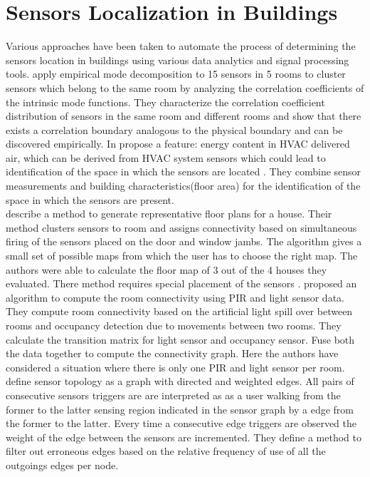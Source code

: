 \section{Sensors Localization in Buildings} 
Various approaches have been taken to automate the process of determining the sensors location in buildings using various data analytics and signal processing tools. \citeauthor{Hong:2013:TAS:2528282.2528302}\cite{Hong:2013:TAS:2528282.2528302} apply empirical mode decomposition to 15 sensors in 5 rooms to cluster sensors which belong to the same room by analyzing the correlation coefficients of the intrinsic mode functions. They characterize the correlation coefficient distribution of sensors in the same room and different rooms and show that there exists a correlation boundary analogous to the physical boundary and can be discovered empirically. 
In \cite{doi:10.1061/9780784413616.226} \citeauthor{doi:10.1061/9780784413616.226} propose a feature: energy content in HVAC delivered air, which can be derived from HVAC system sensors which could lead to identification of the space in which the sensors are located . They combine sensor measurements and building characteristics(floor area) for the identification of the space in which the sensors are present.\\ 
\citeauthor{Lu:2014:SBS:2648771.2629441}\cite{Lu:2014:SBS:2648771.2629441} describe a method to generate representative floor plans for a house. Their method clusters sensors to room and assigns connectivity based on simultaneous firing of the sensors placed on the door and window jambs. The algorithm gives a small set of possible maps from which the user has to choose the right map. The authors were able to calculate the floor map of 3 out of the 4 houses they evaluated.  There method requires special placement of the sensors .
 \citeauthor{ellis2012creating}\cite{ellis2012creating} proposed an algorithm to compute the room connectivity using  PIR and light sensor data. They compute room connectivity based on the artificial light spill over between rooms and occupancy detection due to movements between two rooms. They calculate the transition matrix for light sensor and occupancy sensor. Fuse both the data together to compute the connectivity graph. Here the authors have considered a situation where there is only one PIR and light sensor per room.
\citeauthor{muller2014automated} define  sensor topology as a graph with directed and weighted edges. All pairs of consecutive sensors triggers are are interpreted as as a user walking from the former to the latter sensing region indicated in the sensor graph by a edge from the former to the latter. Every time a consecutive edge triggers are observed the weight of the edge between the sensors are incremented. They define a method to filter out erroneous edges based on the relative frequency of use of all the outgoings edges per node.



